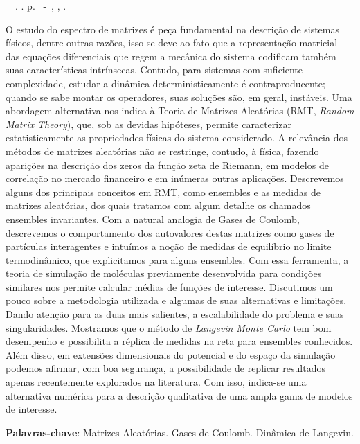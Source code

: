 \setlength{\absparsep}{18pt} %
\begin{resumo}
	\begin{flushleft} 
			\setlength{\absparsep}{0pt} %
			\SingleSpacing 
			\imprimirautorabr~~\textbf{\imprimirtituloresumo}.	\imprimirdata. \pageref{LastPage}p. 
			\imprimirtipotrabalho~-~\imprimirinstituicao, \imprimirlocal, \imprimirdata. 
 	\end{flushleft}
\OnehalfSpacing 	
		
		
O estudo do espectro de matrizes é peça fundamental na descrição de sistemas físicos, dentre outras razões, isso se deve ao fato que a representação matricial das equações diferenciais que regem a mecânica do sistema codificam também suas características intrínsecas. Contudo, para sistemas com suficiente complexidade, estudar a dinâmica deterministicamente é contraproducente; quando se sabe montar os operadores, suas soluções são, em geral, instáveis. Uma abordagem alternativa nos indica à Teoria de Matrizes Aleatórias (RMT, \textit{Random Matrix Theory}), que, sob as devidas hipóteses, permite caracterizar estatisticamente as propriedades físicas do sistema considerado. A relevância dos métodos de matrizes aleatórias não se restringe, contudo, à física, fazendo aparições na descrição dos zeros da função zeta de Riemann, em modelos de correlação no mercado financeiro e em inúmeras outras aplicações. Descrevemos alguns dos principais conceitos em RMT, como ensembles e as medidas de matrizes aleatórias, dos quais tratamos com algum detalhe os chamados ensembles invariantes. Com a natural analogia de Gases de Coulomb, descrevemos o comportamento dos autovalores destas matrizes como gases de partículas interagentes e intuímos a noção de medidas de equilíbrio no limite termodinâmico, que explicitamos para alguns ensembles. Com essa ferramenta, a teoria de simulação de moléculas previamente desenvolvida para condições similares nos permite calcular médias de funções de interesse. Discutimos um pouco sobre a metodologia utilizada e algumas de suas alternativas e limitações. Dando atenção para as duas mais salientes, a escalabilidade do problema e suas singularidades. Mostramos que o método de \textit{Langevin Monte Carlo} tem bom desempenho e possibilita a réplica de medidas na reta para ensembles conhecidos. Além disso, em extensões dimensionais do potencial e do espaço da simulação podemos afirmar, com boa segurança, a possibilidade de replicar resultados apenas recentemente explorados na literatura. Com isso, indica-se uma alternativa numérica para a descrição qualitativa de uma ampla gama de modelos de interesse.

 \textbf{Palavras-chave}: Matrizes Aleatórias. Gases de Coulomb. Dinâmica de Langevin.
\end{resumo}